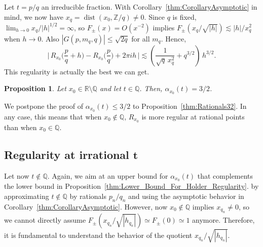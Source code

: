 \documentclass[11pt,reqno]{amsart}
\newtheorem{prop}[thm]{Proposition}
\theoremstyle{definition}
\begin{document}
Let $t = p/q$ an irreducible fraction. 
With Corollary~\ref{thm:CorollaryAsymptotic} in mind, 
we now have $x_q = \operatorname{dist} ( x_0, \mathbb Z/q  ) \neq 0$. 
Since $q$ is fixed, 
$\lim_{h \to 0} x_q / |h|^{1/2} = \infty$, so $F_\pm(x) = O(x^{-2})$ implies 
$F_\pm( x_q/\sqrt{|h|} ) \lesssim |h|/x_q^2 $ when $h \to 0$.
Also $|G(p,m_q,q)| \leq \sqrt{2q}$ for all $m_q$.
Hence, 
\begin{equation}
\Big| \, R_{x_0}\Big( \frac{p}{q} + h \Big) - R_{x_0}\Big( \frac{p}{q} \Big) + 2\pi i h \,  \Big| \lesssim  \left(  \frac{1}{\sqrt{q} \, x_q^2} + q^{3/2} \right) \, h^{3/2}.
\end{equation}
This regularity is actually the best we can get.
\begin{prop}
Let $x_0 \in \mathbb R \setminus \mathbb Q$ and let $t \in \mathbb Q$. 
Then,
$\alpha_{x_0}(t) = 3/2$. 
\end{prop}
We postpone the proof of $\alpha_{x_0}(t) \leq 3/2$ to Proposition~\ref{thm:Rationals32}.
In any case, this means that when $x_0 \notin \mathbb Q$, $R_{x_0}$ is more regular at rational points than when $x_0 \in \mathbb Q$. 




\subsection{Regularity at irrational $\boldsymbol{t}$}
\label{sec:x0_Irrational_Irrationals}
Let now $t \notin \mathbb Q$. 
Again, we aim at an upper bound for $\alpha_{x_0}(t)$ that complements the lower bound in
Proposition~\ref{thm:Lower_Bound_For_Holder_Regularity}.
by approximating $t \not\in \mathbb Q$ by rationals $p_n/q_n$ and using the asymptotic behavior in Corollary~\ref{thm:CorollaryAsymptotic}. 
However, now $x_0 \not\in \mathbb Q$ implies $x_{q_n} \neq 0$, 
so we cannot directly assume $F_\pm(x_{q_n}/\sqrt{|h_{q_n}|}) \simeq F_\pm(0) \simeq 1$ anymore. 
Therefore, it is fundamental to understand the behavior of the quotient $x_{q_n}/\sqrt{|h_{q_n}|}$. 
\end{document}
